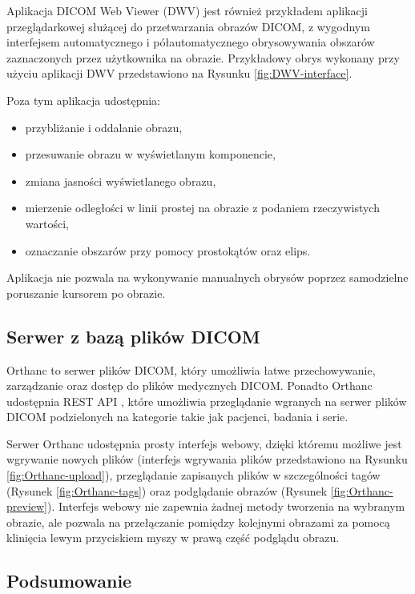 \documentclass[a4paper,11pt,twoside,openright]{report}
\theoremstyle{definition}
\begin{document}
Aplikacja DICOM Web Viewer (DWV) \cite{DWV} jest również przykładem aplikacji
przeglądarkowej służącej do przetwarzania obrazów DICOM, z wygodnym interfejsem
automatycznego i półautomatycznego obrysowywania obszarów zaznaczonych
przez użytkownika na obrazie. Przykładowy obrys wykonany przy użyciu aplikacji
DWV przedstawiono na Rysunku \ref{fig:DWV-interface}.

 Poza tym aplikacja udostępnia:
\begin{itemize}[noitemsep]
\item przybliżanie i oddalanie obrazu,
\item przesuwanie obrazu w wyświetlanym komponencie,
\item zmiana jasności wyświetlanego obrazu,
\item mierzenie odległości w linii prostej na obrazie z podaniem rzeczywistych wartości,
\item oznaczanie obszarów przy pomocy prostokątów oraz elips.
\end{itemize}

Aplikacja nie pozwala na wykonywanie manualnych obrysów poprzez samodzielne
poruszanie kursorem po obrazie.

\subsection {Serwer z bazą plików DICOM}

Orthanc \cite{Orthanc} to serwer plików DICOM, który umożliwia łatwe przechowywanie,
zarządzanie oraz dostęp do plików medycznych DICOM. Ponadto Orthanc udostępnia
REST API \cite{Orthanc API}, które umożliwia przeglądanie wgranych na serwer plików DICOM podzielonych
na kategorie takie jak pacjenci, badania i serie.

Serwer Orthanc udostępnia prosty interfejs webowy, dzięki któremu możliwe jest
wgrywanie nowych plików (interfejs wgrywania plików przedstawiono na Rysunku
\ref{fig:Orthanc-upload}), przeglądanie zapisanych plików w szczególności
tagów (Rysunek \ref{fig:Orthanc-tags}) oraz podglądanie obrazów (Rysunek \ref{fig:Orthanc-preview}).
Interfejs webowy nie zapewnia żadnej metody tworzenia na wybranym obrazie, ale
pozwala na przełączanie pomiędzy kolejnymi obrazami za pomocą klinięcia lewym
przyciskiem myszy w prawą część podglądu obrazu.


\subsection {Podsumowanie}
\end{document}
